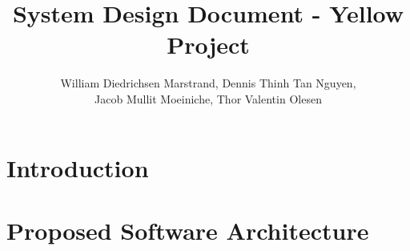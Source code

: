 \documentclass{article}
\title{System Design Document - Yellow Project}
\author{William Diedrichsen Marstrand, Dennis Thinh Tan Nguyen, 
\\Jacob Mullit Moeiniche, Thor Valentin Olesen}
\begin{document}
\maketitle

\section{Introduction}
	
	
	
\section{Proposed Software Architecture}
	
	
	
	
\end{document}
